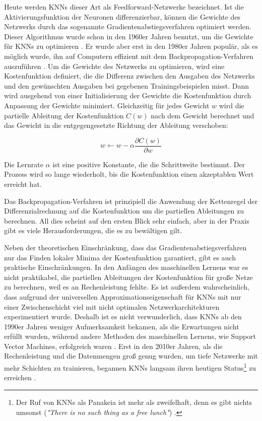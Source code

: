 Heute werden KNNs dieser Art als Feedforward-Netzwerke bezeichnet.
Ist die Aktivierungsfunktion der Neuronen differenzierbar, können die Gewichte des Netzwerks durch das sogenannte Gradientenabstiegsverfahren optimiert werden.
Dieser Algorithmus wurde schon in den 1960er Jahren benutzt, um die Gewichte für KNNs zu optimieren \cite{Amari1967}.
Er wurde aber erst in den 1980er Jahren populär, als es möglich wurde, ihn auf Computern effizient mit dem Backpropagation-Verfahren auszuführen \cite{Rumelhart1986}.
Um die Gewichte des Netzwerks zu optimieren, wird eine Kostenfunktion definiert, die die Differenz zwischen den Ausgaben des Netzwerks und den gewünschten Ausgaben bei gegebenen Trainingsbeispielen misst.
Dann wird ausgehend von einer Initialisierung der Gewichte die Kostenfunktion durch Anpassung der Gewichte minimiert.
Gleichzeitig für jedes Gewicht $w$ wird die partielle Ableitung der Kostenfunktion $C(w)$ nach dem Gewicht berechnet und das Gewicht in die entgegengesetzte Richtung der Ableitung verschoben:

$$
w \leftarrow w - \alpha \frac{\partial C(w)}{\partial w}
$$

Die Lernrate $\alpha$ ist eine positive Konstante, die die Schrittweite bestimmt.
Der Prozess wird so lange wiederholt, bis die Kostenfunktion einen akzeptablen Wert erreicht hat.

Das Backpropagation-Verfahren ist prinzipiell die Anwendung der Kettenregel der Differenzialrechnung auf die Kostenfunktion um die partiellen Ableitungen zu berechnen.
All dies scheint auf den ersten Blick sehr einfach, aber in der Praxis gibt es viele Herausforderungen, die es zu bewältigen gilt.

Neben der theoretischen Einschränkung, dass das Gradientenabstiegsverfahren nur das Finden lokaler Minima der Kostenfunktion garantiert, gibt es auch praktische Einschränkungen.
In den Anfängen des maschinellen Lernens war es nicht praktikabel, die partiellen Ableitungen der Kostenfunktion für große Netze zu berechnen, weil es an Rechenleistung fehlte.
Es ist außerdem wahrscheinlich, dass aufgrund der universellen Approximationseigenschaft für KNNs mit nur einer Zwischenschicht viel mit nicht optimalen Netzwerkarchitekturen experimentiert wurde.
Deshalb ist es nicht verwunderlich, dass KNNs ab den 1990er Jahren weniger Aufmerksamkeit bekamen, als die Erwartungen nicht erfüllt wurden, während andere Methoden des maschinellen Lernens, wie \foreignlanguage{english}{Support Vector Machines}, erfolgreich waren \cite{Schmidhuber2015}.
Erst in den 2010er Jahren, als die Rechenleistung und die Datenmengen groß genug wurden, um tiefe Netzwerke mit mehr Schichten zu trainieren, begannen KNNs langsam ihren heutigen Status\footnote{Der Ruf von KNNs als Panakeia ist mehr als zweifelhaft, denn \glqq es gibt nichts umsonst\grqq{} (\textit{\foreignlanguage{english}{"There is no such thing as a free lunch"}}) \cite{NoFreeLunch}.} zu erreichen \cite{Schmidhuber2015}.

